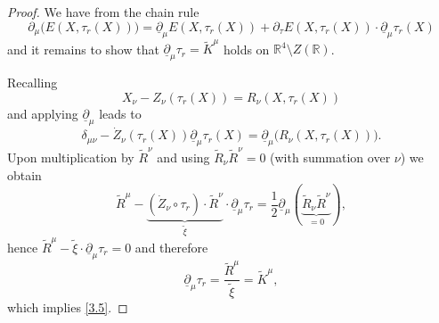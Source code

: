 \documentclass[10pt,a4paper]{amsart}
\newcommand{\R}{\mb{R}}
\renewcommand{\d}{\ensuremath{\partial}}
\newcommand{\de}{\delta}
\newcommand{\mb}[1]{\ensuremath{\mathbb{#1}}}
\newcommand{\ud}{\underline{\d}}
\begin{document}
\begin{proof} We have from the chain rule
$$
\d_\mu \Big( E(X,\tau_r(X)) \Big)   
  = \ud_\mu E(X,\tau_r(X)) +  \d_\tau E(X,\tau_r(X)) \cdot \ud_\mu \tau_r(X)
$$
and it remains to show that $\ud_\mu \tau_r = \widetilde{K}^\mu$ holds on $\R^4 \setminus Z(\R)$.


Recalling 
\[
X_\nu-Z_\nu(\tau_r(X)) = R_\nu(X,\tau_r(X))
\]
and applying $\ud_\mu$ leads to
\[
\de_{\mu \nu} -\dot{Z}_\nu (\tau_r(X)) \ud_\mu \tau_r (X) = \ud_\mu \Big( R_\nu(X,\tau_r(X)) \Big).
\]
Upon multiplication by $\widetilde{R}^\nu$ and using $\widetilde{R}_\nu \widetilde{R}^\nu=0$ (with summation over $\nu$) we obtain
\[
 \widetilde{R}^\mu - \underbrace{(\dot{Z}_\nu \circ \tau_r) \cdot  \widetilde{R}^\nu}_{\widetilde{\xi}} \cdot \ud_\mu \tau_r 
    = \frac{1}{2}\ud_\mu(\underbrace{\widetilde{R}_\nu \widetilde{R}^\nu}_{=0}),
\]
hence $\widetilde{R}^\mu - \widetilde{\xi} \cdot \ud_\mu \tau_r = 0$ and therefore
\[
 \ud_\mu \tau_r = \frac{\widetilde{R}^\mu}{\widetilde{\xi}} = \widetilde{K}^\mu,
\]
which implies \eqref{3.5}.
\end{proof}
\end{document}
